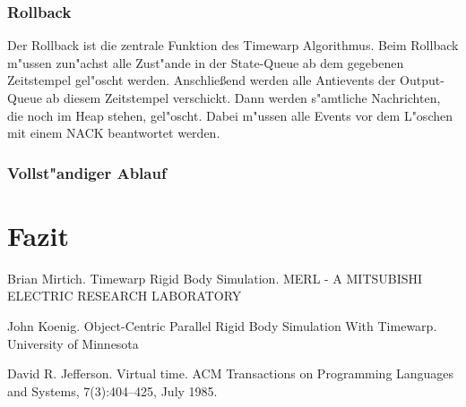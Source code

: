 \documentclass[a4paper, 10pt, openright, parskip, chapterprefix]{scrreprt}
\begin{document}
\subsection{Rollback}
\label{subsec:Rollback}
Der Rollback ist die zentrale Funktion des Timewarp Algorithmus. Beim Rollback m"ussen zun"achst alle Zust"ande in der
State-Queue ab dem gegebenen Zeitstempel gel"oscht werden. Anschlie\ss end werden alle Antievents der Output-Queue ab
diesem Zeitstempel verschickt. Dann werden s"amtliche Nachrichten, die noch im Heap stehen, gel"oscht. Dabei m"ussen
alle Events vor dem L"oschen mit einem NACK beantwortet werden.

\subsection{Vollst"andiger Ablauf}

\chapter{Fazit}
\begin{thebibliography}{10}
Brian Mirtich. Timewarp Rigid Body Simulation. MERL - A MITSUBISHI ELECTRIC RESEARCH LABORATORY

John Koenig. Object-Centric Parallel Rigid Body Simulation With Timewarp. University of Minnesota

David R. Jefferson. Virtual time. ACM Transactions on Programming Languages and Systems, 7(3):404–425, July 1985.
\end{thebibliography}
\end{document}
